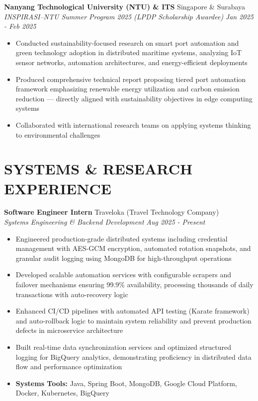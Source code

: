 \documentclass[10pt,a4paper]{article}
\newcommand{\experienceheader}[4]{
    \textbf{#1} \hfill #2 \\
    \textit{#3} \hfill \textit{#4}
}
\begin{document}
\experienceheader{Nanyang Technological University (NTU) \& ITS}{Singapore \& Surabaya}{INSPIRASI–NTU Summer Program 2025 (LPDP Scholarship Awardee)}{Jan 2025 - Feb 2025}
\begin{itemize}[leftmargin=*, itemsep=2pt, topsep=2pt]
    \item Conducted sustainability-focused research on smart port automation and green technology adoption in distributed maritime systems, analyzing IoT sensor networks, automation architectures, and energy-efficient deployments
    \item Produced comprehensive technical report proposing tiered port automation framework emphasizing renewable energy utilization and carbon emission reduction — directly aligned with sustainability objectives in edge computing systems
    \item Collaborated with international research teams on applying systems thinking to environmental challenges
\end{itemize}

\section*{SYSTEMS \& RESEARCH EXPERIENCE}

\experienceheader{Software Engineer Intern}{Traveloka (Travel Technology Company)}{Systems Engineering \& Backend Development}{Aug 2025 - Present}
\begin{itemize}[leftmargin=*, itemsep=2pt, topsep=2pt]
    \item Engineered production-grade distributed systems including credential management with AES-GCM encryption, automated rotation snapshots, and granular audit logging using MongoDB for high-throughput operations
    \item Developed scalable automation services with configurable scrapers and failover mechanisms ensuring 99.9\% availability, processing thousands of daily transactions with auto-recovery logic
    \item Enhanced CI/CD pipelines with automated API testing (Karate framework) and auto-rollback logic to maintain system reliability and prevent production defects in microservice architecture
    \item Built real-time data synchronization services and optimized structured logging for BigQuery analytics, demonstrating proficiency in distributed data flow and performance optimization
    \item \textbf{Systems Tools:} Java, Spring Boot, MongoDB, Google Cloud Platform, Docker, Kubernetes, BigQuery
\end{itemize}
\end{document}
